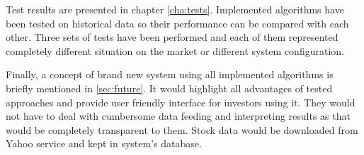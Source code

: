 Test results are presented in chapter \ref{cha:tests}. 
Implemented algorithms have been tested on historical data so their performance can be compared with each other.
Three sets of tests have been performed and each of them represented completely different situation on the market or different system configuration.

Finally, a concept of brand new system using all implemented algorithms is briefly mentioned in \ref{sec:future}.
It would highlight all advantages of tested approaches and provide user friendly interface for investors using it.
They would not have to deal with cumbersome data feeding and interpreting results as that would be completely transparent to them.
Stock data would be downloaded from Yahoo service and kept in system's database.
 










